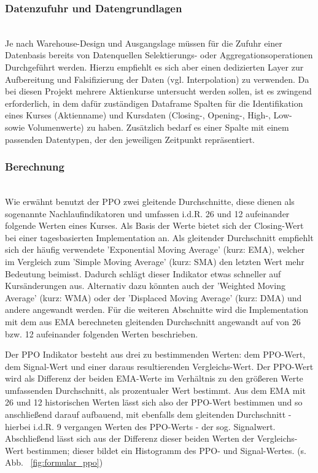 \subsubsection{Datenzufuhr und Datengrundlagen}~\\
\label{subsec_datenbase_ppo}
Je nach Warehouse-Design und Ausgangslage müssen für die Zufuhr einer Datenbasis bereits von Datenquellen Selektierungs- oder Aggregationsoperationen Durchgeführt werden. Hierzu empfiehlt es sich aber einen dedizierten Layer zur Aufbereitung und Falsifizierung der Daten (vgl. Interpolation) zu verwenden. 
Da bei diesen Projekt mehrere Aktienkurse untersucht werden sollen, ist es zwingend erforderlich, in dem dafür zuständigen Dataframe Spalten für die Identifikation eines Kurses (Aktienname) und Kursdaten (Closing-, Opening-,  High-, Low- sowie Volumenwerte) zu haben. Zusätzlich bedarf es einer Spalte mit einem passenden Datentypen, der den jeweiligen Zeitpunkt repräsentiert.

\subsubsection{Berechnung}~\\
\label{subsec_berrechnung_ppo}
Wie erwähnt benutzt der PPO zwei gleitende Durchschnitte, diese dienen als sogenannte Nachlaufindikatoren und umfassen i.d.R. 26 und 12 aufeinander folgende Werten eines Kurses. Als Basis der Werte bietet sich der Closing-Wert bei einer tagesbasierten Implementation an. Als gleitender Durchschnitt empfiehlt sich der häufig verwendete 'Exponential Moving Average' (kurz: EMA), welcher im Vergleich zum 'Simple Moving Average' (kurz: SMA) den letzten Wert mehr Bedeutung beimisst. Dadurch schlägt dieser Indikator etwas schneller auf Kursänderungen aus. Alternativ dazu könnten auch der 'Weighted Moving Average' (kurz: WMA) oder der 'Displaced Moving Average' (kurz: DMA) und andere angewandt werden. Für die weiteren Abschnitte wird die Implementation mit dem aus EMA berechneten gleitenden Durchschnitt angewandt auf von 26 bzw. 12 aufeinander folgenden Werten beschrieben. \cite{tvWikiPpo,inoPedPpo,inoPedEma}

Der PPO Indikator besteht aus drei zu bestimmenden Werten: dem PPO-Wert, dem Signal-Wert und einer daraus resultierenden Vergleichs-Wert. Der PPO-Wert wird als Differenz der beiden EMA-Werte im Verhältnis zu den größeren Werte umfassenden Durchschnitt, als prozentualer Wert bestimmt. Aus dem EMA mit 26 und 12 historischen Werten lässt sich also der PPO-Wert bestimmen und so anschließend darauf aufbauend, mit ebenfalls dem gleitenden Durchschnitt - hierbei i.d.R. 9 vergangen Werten des PPO-Werts - der sog. Signalwert. Abschließend lässt sich aus der Differenz dieser beiden Werten der Vergleichs-Wert bestimmen; dieser bildet ein Histogramm des PPO- und Signal-Wertes. (s. Abb. ~\ref{fig:formular_ppo}) \cite{tvWikiPpo,inoPedPpo}

